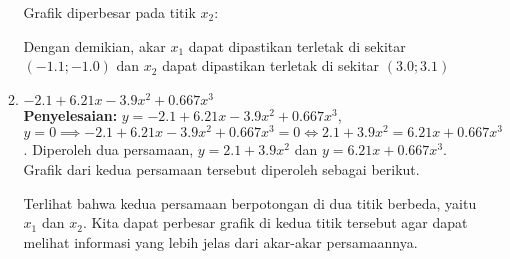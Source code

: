 \documentclass{article}
\newcommand{\penyelesaian}{\textbf{Penyelesaian: }}
\begin{document}
\begin{enumerate}
\begin{enumerate}
        Grafik diperbesar pada titik $x_2$:
        \begin{center}
        \end{center}
        Dengan demikian, akar $x_1$ dapat dipastikan terletak di sekitar $(\num{-1,1}; \num{-1,0})$ dan $x_2$ dapat dipastikan terletak di sekitar $(\num{3,0}; \num{3,1})$

        \pagebreak

        \item $\num{-2,1} + \num{6,21}x - \num{3,9}x^2 + \num{0,667}x^3$ \\
        \penyelesaian $y = \num{-2,1} + \num{6,21}x - \num{3,9}x^2 + \num{0,667}x^3$, \\
        $y = 0 \implies \num{-2,1} + \num{6,21}x - \num{3,9}x^2 + \num{0,667}x^3 = 0 \Leftrightarrow \num{2,1} + \num{3,9}x^2 = \num{6,21}x + \num{0,667}x^3$.
        Diperoleh dua persamaan, $y = \num{2,1} + \num{3,9}x^2$ dan $y = \num{6,21}x + \num{0,667}x^3$. \\

        Grafik dari kedua persamaan tersebut diperoleh sebagai berikut.
        \begin{center}
        \end{center}
        Terlihat bahwa kedua persamaan berpotongan di dua titik berbeda, yaitu $x_1$ dan $x_2$. 
        Kita dapat perbesar grafik di kedua titik tersebut agar dapat melihat informasi yang lebih jelas dari akar-akar persamaannya.\\


\end{enumerate}
\end{enumerate}
\end{document}
